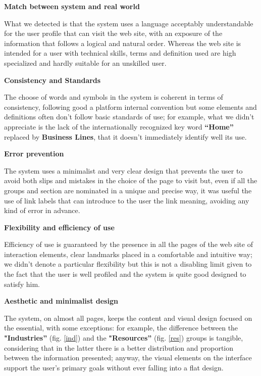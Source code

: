 \textbf{Match between system and real world}\par
What we detected is that the system uses a language acceptably understandable for the user profile that can visit the web site, with an exposure of the information that follows a logical and natural order. Whereas the web site is intended for a user with technical skills, terms and definition used are high specialized and hardly suitable for an unskilled user. 
\medskip

\textbf{Consistency and Standards}\par
The choose of words and symbols in the system is coherent in terms of consistency, following good a platform internal convention but some elements and definitions often don't follow basic standards of use; for example, what we didn’t appreciate is the lack of the internationally recognized key word \textbf{“Home”} replaced by \textbf{Business Lines}, that it doesn’t immediately identify well its use. 
\medskip

\textbf{Error prevention}\par
The system uses a minimalist and very clear design that prevents the user to avoid both slips and mistakes in the choice of the page to visit but, even if all the groups and section are nominated in a unique and precise way, it was useful the use of link labels that can introduce to the user the link meaning, avoiding any kind of error in advance. 
\medskip

\textbf{Flexibility and efficiency of use}\par
Efficiency of use is guaranteed by the presence in all the pages of the web site of interaction elements, clear landmarks placed in a comfortable and intuitive way; we didn’t denote a particular flexibility but this is not a disabling limit given to the fact that the user is well profiled and the system is quite good designed to satisfy him. 
\medskip

\textbf{Aesthetic and minimalist design}\par
The system, on almost all pages, keeps the content and visual design focused on the essential, with some exceptions: for example, the difference between the \textbf{"Industries”} (fig. \ref{ind}) and the \textbf{"Resources”} (fig. \ref{res}) groups is tangible, considering that in the latter there is a better distribution and proportion between the information presented; anyway, the visual elements on the interface support the user’s primary goals without ever falling into a flat design. 

